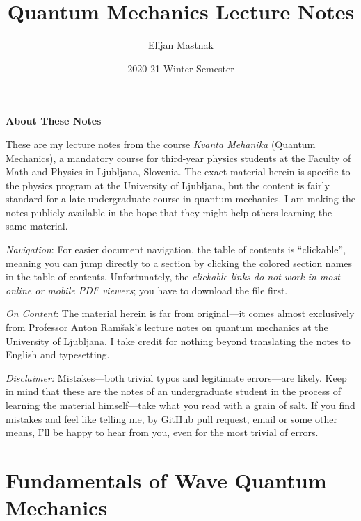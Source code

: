 \documentclass[11pt, a4paper]{article}
\begin{document}
\title{Quantum Mechanics Lecture Notes}
\author{Elijan Mastnak}
\date{2020-21 Winter Semester}
\maketitle

\begin{center}
\textbf{About These Notes}
\end{center}
These are my lecture notes from the course \textit{Kvanta Mehanika} (Quantum Mechanics), a mandatory course for third-year physics students at the Faculty of Math and Physics in Ljubljana, Slovenia. The exact material herein is specific to the physics program at the University of Ljubljana, but the content is fairly standard for a late-undergraduate course in quantum mechanics. I am making the notes publicly available in the hope that they might help others learning the same material.


\vspace{2mm}
\textit{Navigation}: For easier document navigation, the table of contents is ``clickable'', meaning you can jump directly to a section by clicking the colored section names in the table of contents. Unfortunately, the \textit{clickable links do not work in most online or mobile PDF viewers}; you have to download the file first.

\vspace{2mm}
\textit{On Content}: The material herein is far from original---it comes almost exclusively from Professor Anton Ram\v{s}ak's lecture notes on quantum mechanics at the University of Ljubljana. I take credit for nothing beyond translating the notes to English and typesetting.

\vspace{2mm}
\textit{Disclaimer:} Mistakes---both trivial typos and legitimate errors---are likely. Keep in mind that these are the notes of an undergraduate student in the process of learning the material himself---take what you read with a grain of salt. If you find mistakes and feel like telling me, by \href{https://github.com/ejmastnak/fmf}{\underline{GitHub}} pull request, \href{mailto:ejmastnak@gmail.com}{\underline{email}} or some other means, I'll be happy to hear from you, even for the most trivial of errors.

\newpage

\tableofcontents

\newpage

\pagestyle{headerstyle}
\section{Fundamentals of Wave Quantum Mechanics}
\end{document}
